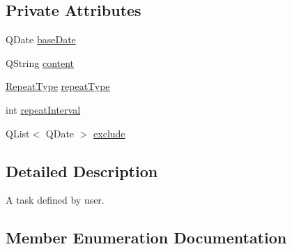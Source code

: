 \subsection*{Private Attributes}
\begin{DoxyCompactItemize}
\item 
Q\+Date \hyperlink{classTask_a20cc2347b30cba60fb1da685ef8756c5}{base\+Date}
\item 
Q\+String \hyperlink{classTask_a9432e6a8bd681ddff95d3ee646193267}{content}
\item 
\hyperlink{classTask_a93fe2c7346381e2e631fb2ba63ac0344}{Repeat\+Type} \hyperlink{classTask_adf98bd28ce45d18bcc9f337cc425fd89}{repeat\+Type}
\item 
int \hyperlink{classTask_af61e693a3a2dec42646081d60c57df3e}{repeat\+Interval}
\item 
Q\+List$<$ Q\+Date $>$ \hyperlink{classTask_a7ea8d8cc5ad0786d7e1b0bbc34f58863}{exclude}
\end{DoxyCompactItemize}


\subsection{Detailed Description}
A task defined by user. 

\subsection{Member Enumeration Documentation}
